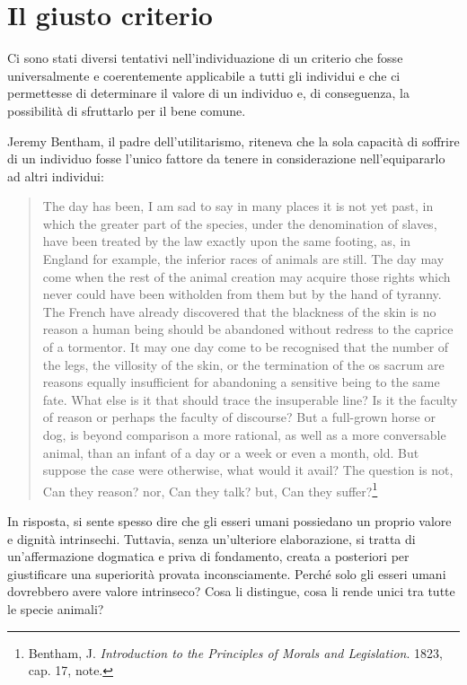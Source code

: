 \documentclass[a4paper,11pt,oneside,article]{memoir}
\begin{document}
\chapter{Il giusto criterio}

Ci sono stati diversi tentativi nell'individuazione di un criterio che fosse
universalmente e coerentemente applicabile a tutti gli individui e che ci
permettesse di determinare il valore di un individuo e, di conseguenza, la
possibilità di sfruttarlo per il bene comune.

Jeremy Bentham, il padre dell'utilitarismo, riteneva che la sola capacità di
soffrire di un individuo fosse l'unico fattore da tenere in considerazione
nell'equipararlo ad altri individui:

\begin{quotation}

The day has been, I am sad to say in many places it is not yet past, in which
the greater part of the species, under the denomination of slaves, have been
treated by the law exactly upon the same footing, as, in England for example,
the inferior races of animals are still. The day may come when the rest of the
animal creation may acquire those rights which never could have been witholden
from them but by the hand of tyranny. The French have already discovered that
the blackness of the skin is no reason a human being should be abandoned without
redress to the caprice of a tormentor. It may one day come to be recognised that
the number of the legs, the villosity of the skin, or the termination of the os
sacrum are reasons equally insufficient for abandoning a sensitive being to the
same fate. What else is it that should trace the insuperable line? Is it the
faculty of reason or perhaps the faculty of discourse? But a full-grown horse or
dog, is beyond comparison a more rational, as well as a more conversable animal,
than an infant of a day or a week or even a month, old. But suppose the case
were otherwise, what would it avail? The question is not, Can they reason? nor,
Can they talk? but, Can they suffer?\footnote{Bentham, J. \emph{Introduction to
the Principles of Morals and Legislation}. 1823, cap. 17, note.}

\end{quotation}

In risposta, si sente spesso dire che gli esseri umani possiedano un proprio
valore e dignità intrinsechi. Tuttavia, senza un'ulteriore elaborazione, si
tratta di un'affermazione dogmatica e priva di fondamento, creata a posteriori
per giustificare una superiorità provata inconsciamente. Perché solo gli esseri
umani dovrebbero avere valore intrinseco? Cosa li distingue, cosa li rende unici
tra tutte le specie animali?
\end{document}
